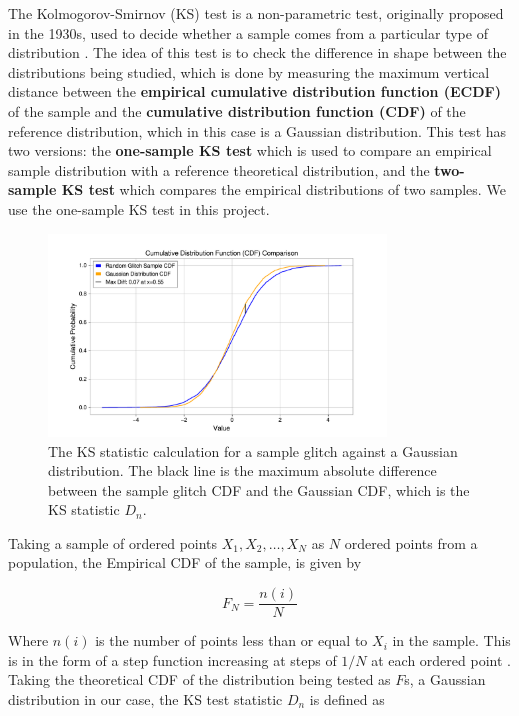 \documentclass[12pt]{article}
\begin{document}
The Kolmogorov-Smirnov (KS) test is a non-parametric test, originally proposed in the 1930s, used to decide whether a sample comes from a particular type of distribution \cite{Kolmogorov_1951, chakravarti1967}. The idea of this test is to check the difference in shape between the distributions being studied, which is done by measuring the maximum vertical distance between the \textbf{empirical cumulative distribution function (ECDF)} of the sample and the \textbf{cumulative distribution function (CDF)} of the reference distribution, which in this case is a Gaussian distribution. This test has two versions: the \textbf{one-sample KS test} which is used to compare an empirical sample distribution with a reference theoretical distribution, and the \textbf{two-sample KS test} which compares the empirical distributions of two samples. We use the one-sample KS test in this project.

\begin{figure}[H]
    \centering
    \includegraphics[width=0.8\textwidth]{images/cdf_comparison_glitch_gaussian.pdf}
    \caption{The KS statistic calculation for a sample glitch against a Gaussian distribution. The black line is the maximum absolute difference between the sample glitch CDF and the Gaussian CDF, which is the KS statistic $D_n$.}
    \label{fig:ecdf_cdf_comparison}
\end{figure}

\medskip
\noindent  Taking a sample of ordered points $X_1, X_2, \ldots, X_N$ as $N$ ordered points from a population, the Empirical CDF of the sample, is given by

\begin{equation}
    F_N = \frac{n(i)}{N}
    \label{eq:edf}
\end{equation}

\medskip
\noindent Where $n(i)$ is the number of points less than or equal to $X_i$ in the sample. This is in the form of a step function increasing at steps of $1/N$ at each ordered point \cite{guthrie_nistsematech_2020}. Taking the theoretical CDF of the distribution being tested as $F$s, a Gaussian distribution in our case, the KS test statistic $D_n$ is defined as
\end{document}
